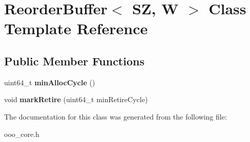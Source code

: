 \hypertarget{classReorderBuffer}{\section{Reorder\-Buffer$<$ S\-Z, W $>$ Class Template Reference}
\label{classReorderBuffer}
}
\subsection*{Public Member Functions}
\begin{DoxyCompactItemize}
\item 
\hypertarget{classReorderBuffer_aa510ddc1b2706437d779c447d6c0809a}{uint64\-\_\-t {\bfseries min\-Alloc\-Cycle} ()}\label{classReorderBuffer_aa510ddc1b2706437d779c447d6c0809a}

\item 
\hypertarget{classReorderBuffer_a9c42043d09b09f67e324b8244b9a1f3a}{void {\bfseries mark\-Retire} (uint64\-\_\-t min\-Retire\-Cycle)}\label{classReorderBuffer_a9c42043d09b09f67e324b8244b9a1f3a}

\end{DoxyCompactItemize}


The documentation for this class was generated from the following file\-:\begin{DoxyCompactItemize}
\item 
ooo\-\_\-core.\-h\end{DoxyCompactItemize}
